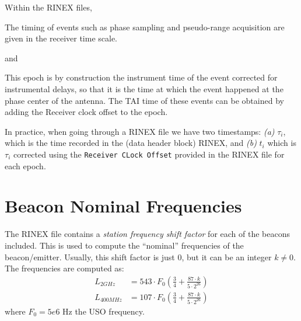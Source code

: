 Within the RINEX files,
\begin{displayquote}
  The timing of events such as phase sampling and pseudo-range acquisition are 
  given in the receiver time scale.
\end{displayquote}
and
\begin{displayquote}
  This epoch is by construction the instrument time of the event corrected for 
  instrumental delays, so that it is the time at which the event happened at the 
  phase center of the antenna.
  The TAI time of these events can be obtained by adding the Receiver clock 
  offset to the epoch.
\end{displayquote}

In practice, when going through a RINEX file we have two timestamps: 
\textit{(a)} $\tau _i$, which is the time recorded in the (data header block) 
RINEX, and \textit{(b)} $t_i$ which is $\tau _i$ corrected using the 
\texttt{Receiver CLock Offset} provided in the RINEX file for each epoch.


\section{Beacon Nominal Frequencies}
\label{sec:beacon-nominal-frequencies}
The RINEX file contains a \emph{station frequency shift factor} for each of the 
beacons included. This is used to compute the ``nominal'' frequencies of the 
beacon/emitter. Usually, this shift factor is just $0$, but it can be an integer 
$k \neq 0$. The frequencies are computed as:
\begin{equation}
  \begin{aligned}
    L_{2GHz}   &= 543 \cdot F_0 \left( \frac{3}{4} + \frac{87\cdot k}{5 \cdot 2^{26}} \right) \\
    L_{400MHz} &= 107 \cdot F_0 \left( \frac{3}{4} + \frac{87\cdot k}{5 \cdot 2^{26}} \right) 
  \end{aligned}
\end{equation}
where $F_0 = 5e6 \text{ Hz}$ the USO frequency.

